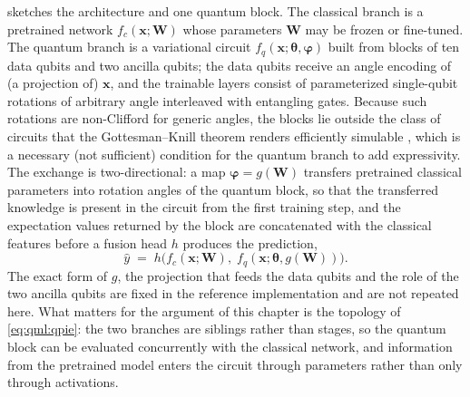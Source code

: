  sketches the architecture and one quantum block. The classical branch is a pretrained network $f_c(\bm{x}; \bm{W})$ whose parameters $\bm{W}$ may be frozen or fine-tuned. The quantum branch is a variational circuit $f_q(\bm{x}; \bm{\theta}, \bm{\varphi})$ built from blocks of ten data qubits and two ancilla qubits; the data qubits receive an angle encoding of (a projection of) $\bm{x}$, and the trainable layers consist of parameterized single-qubit rotations of arbitrary angle interleaved with entangling gates. Because such rotations are non-Clifford for generic angles, the blocks lie outside the class of circuits that the Gottesman--Knill theorem renders efficiently simulable \cite{aaronson2004stabilizer}, which is a necessary (not sufficient) condition for the quantum branch to add expressivity. The exchange is two-directional: a map $\bm{\varphi} = g(\bm{W})$ transfers pretrained classical parameters into rotation angles of the quantum block, so that the transferred knowledge is present in the circuit from the first training step, and the expectation values returned by the block are concatenated with the classical features before a fusion head $h$ produces the prediction,
\begin{equation}\label{eq:qml:qpie}
\hat{y} \;=\; h\big(f_c(\bm{x}; \bm{W}),\; f_q(\bm{x}; \bm{\theta}, g(\bm{W}))\big).
\end{equation}
The exact form of $g$, the projection that feeds the data qubits and the role of the two ancilla qubits are fixed in the reference implementation and are not repeated here. What matters for the argument of this chapter is the topology of \cref{eq:qml:qpie}: the two branches are siblings rather than stages, so the quantum block can be evaluated concurrently with the classical network, and information from the pretrained model enters the circuit through parameters rather than only through activations.

